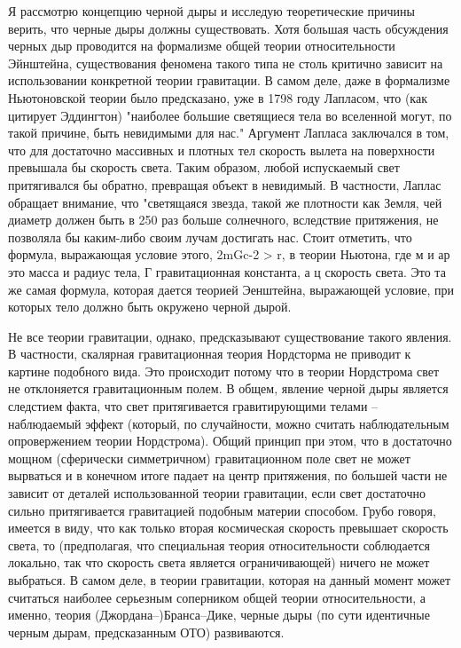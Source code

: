 \documentclass[a4paper, 10pt, twocolumn]{article}
\begin{document}
Я рассмотрю концепцию черной дыры и исследую теоретические причины 
верить, что черные дыры должны существовать. Хотя большая часть 
обсуждения черных дыр проводится на формализме общей теории 
относительности Эйнштейна, существования феномена такого типа не столь 
критично зависит на использовании конкретной теории гравитации. В самом 
деле, даже в формализме Ньютоновской теории было предсказано, уже в 1798 
году Лапласом, что (как цитирует Эддингтон) "наиболее большие светящиеся 
тела во вселенной могут, по такой причине, быть невидимыми для нас." 
Аргумент Лапласа заключался в том, что для достаточно массивных 
и плотных тел скорость вылета на поверхности превышала бы скорость 
света. Таким образом, любой испускаемый свет притягивался бы обратно, 
превращая объект в невидимый. В частности, Лаплас обращает внимание, что 
"светящаяся звезда, такой же плотности как Земля, чей диаметр должен 
быть в 250 раз больше солнечного, вследствие притяжения, не позволяла бы 
каким-либо своим лучам достигать нас. Стоит отметить, что формула, 
выражающая условие этого, 2mGc-2 > r, в теории Ньютона, где м и ар это 
масса и радиус тела, Г гравитационная константа, а ц скорость света. Это 
та же самая формула, которая дается теорией Эенштейна, выражающей 
условие, при которых тело должно быть окружено черной дырой.

Не все теории гравитации, однако, предсказывают существование такого 
явления. В частности, скалярная гравитационная теория Нордсторма не 
приводит к картине подобного вида. Это происходит потому что в теории 
Нордстрома свет не отклоняется гравитационным полем. В общем, явление 
черной дыры является следстием факта, что свет притягивается 
гравитирующими телами -- наблюдаемый эффект (который, по случайности, 
можно считать наблюдательным опровержением теории Нордстрома). Общий 
принцип при этом, что в достаточно мощном (сферически симметричном) 
гравитационном поле свет не может вырваться и в конечном итоге падает на 
центр притяжения, по большей части не зависит от деталей использованной 
теории гравитации, если свет достаточно сильно притягивается гравитацией 
подобным материи способом. Грубо говоря, имеется в виду, что как только 
вторая космическая скорость превышает скорость света, то (предполагая, 
что специальная теория относительности соблюдается локально, так что 
скорость света является ограничивающей) ничего не может выбраться. 
В самом деле, в теории гравитации, которая на данный момент может 
считаться наиболее серьезным соперником общей теории относительности, 
а именно, теория (Джордана--)Бранса--Дике, черные дыры (по сути 
идентичные черным дырам, предсказанным ОТО) развиваются.
\end{document}
